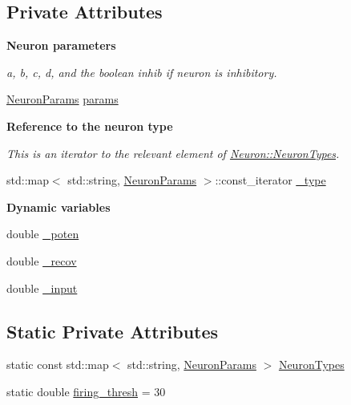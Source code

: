 \subsection*{Private Attributes}
\begin{Indent}\textbf{ Neuron parameters}\par
{\em {\ttfamily a}, {\ttfamily b}, {\ttfamily c}, {\ttfamily d}, and the boolean {\ttfamily inhib} if neuron is inhibitory. }\begin{DoxyCompactItemize}
\item 
\hyperlink{structNeuronParams}{Neuron\+Params} \hyperlink{classNeuron_a9427965b6669c7c35c327689de7a4d63}{params}
\end{DoxyCompactItemize}
\end{Indent}
\begin{Indent}\textbf{ Reference to the neuron type}\par
{\em This is an iterator to the relevant element of \hyperlink{classNeuron_ab4b47274e756b72923d2f8a9a5037d23}{Neuron\+::\+Neuron\+Types}. }\begin{DoxyCompactItemize}
\item 
std\+::map$<$ std\+::string, \hyperlink{structNeuronParams}{Neuron\+Params} $>$\+::const\+\_\+iterator \hyperlink{classNeuron_af48de7c2ad739fc5d57bfa2f3b1f7663}{\+\_\+type}
\end{DoxyCompactItemize}
\end{Indent}
\begin{Indent}\textbf{ Dynamic variables}\par
\begin{DoxyCompactItemize}
\item 
double \hyperlink{classNeuron_a7f7fdc3f9550b870351c60f618c11376}{\+\_\+poten}
\item 
double \hyperlink{classNeuron_a7bc9f5b85125f2c2596b64766796002b}{\+\_\+recov}
\item 
double \hyperlink{classNeuron_ac1311b3b22122a67743615ee40caba6d}{\+\_\+input}
\end{DoxyCompactItemize}
\end{Indent}
\subsection*{Static Private Attributes}
\begin{DoxyCompactItemize}
\item 
static const std\+::map$<$ std\+::string, \hyperlink{structNeuronParams}{Neuron\+Params} $>$ \hyperlink{classNeuron_ab4b47274e756b72923d2f8a9a5037d23}{Neuron\+Types}
\item 
static double \hyperlink{classNeuron_a9173cec15070307b635e58f976113ad7}{firing\+\_\+thresh} = 30
\end{DoxyCompactItemize}


